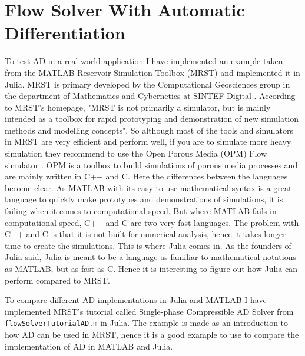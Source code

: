 \section{Flow Solver With Automatic Differentiation}
\label{sec:FlowSolver}
To test AD in a real world application I have implemented an example taken from the MATLAB Reservoir Simulation Toolbox (MRST) and implemented it in Julia. MRST is primary developed by the Computational Geosciences group in the department of Mathematics and Cybernetics at SINTEF Digital \emph{\cite{mrstHomepage}}. According to MRST's homepage, "MRST is not primarily a simulator, but is mainly intended as a toolbox for rapid prototyping and demonstration of new simulation methods and modelling concepts". So although most of the tools and simulators in MRST are very efficient and perform well, if you are to simulate more heavy simulation they recommend to use the Open Porous Media (OPM) Flow simulator \emph{\citep{OPM}}. OPM is a toolbox to build simulations of porous media processes and are mainly written in C++ and C. Here the differences between the languages become clear. As MATLAB with its easy to use mathematical syntax is a great language to quickly make prototypes and demonstrations of simulations, it is failing when it comes to computational speed. But where MATLAB fails in computational speed, C++ and C are two very fast languages. The problem with C++ and C is that it is not built for numerical analysis, hence it takes longer time to create the simulations. This is where Julia comes in. As the founders of Julia said, Julia is meant to be a language as familiar to mathematical notations as MATLAB, but as fast as C. Hence it is interesting to figure out how Julia can perform compared to MRST.

To compare different AD implementations in Julia and MATLAB I have implemented MRST's tutorial called Single-phase Compressible AD Solver from \texttt{flowSolverTutorialAD.m} \emph{\citep{flowSolverADExample}} in Julia. The example is made as an introduction to how AD can be used in MRST, hence it is a good example to use to compare the implementation of AD in MATLAB and Julia. 

